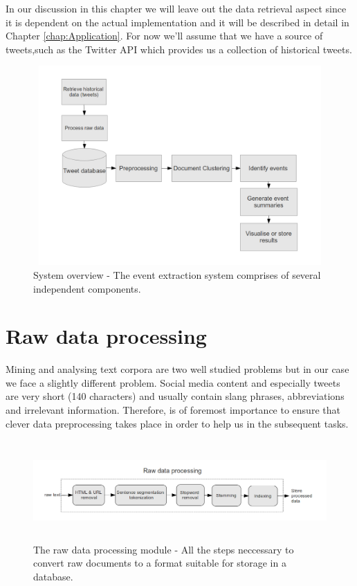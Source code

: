 In our discussion in this chapter we will leave out the data retrieval aspect since it is dependent on the actual implementation and it 
will be described in detail in Chapter \ref{chap:Application}. For now we'll assume that we have a source of tweets,such as the Twitter API which provides 
us a collection of historical tweets. 

\begin{figure}[!htbp]
  \begin{center}
    \includegraphics[height=3in, width=6in]{system-overview}
    \caption{System overview - The event extraction system comprises of several independent components.}
    \label{SystemOverview}
  \end{center}
\end{figure}

\section{Raw data processing}\label{RawDataProcessing}
Mining and analysing text corpora are two well studied problems but in our case we face a slightly
different problem. Social media content and especially tweets are very short (140 characters)
and usually contain slang phrases, abbreviations and irrelevant information. Therefore, is of
foremost importance to ensure that clever data preprocessing takes place in order to help us in
the subsequent tasks. 

\begin{figure}[!htbp]
  \begin{center}
    \includegraphics[height=1.5in, width=6in]{raw-data-processing}
    \caption{The raw data processing module - All the steps neccessary to convert raw documents to a format suitable for storage in a database.}
    \label{RawDataProcessingOverview}
  \end{center}
\end{figure} 

